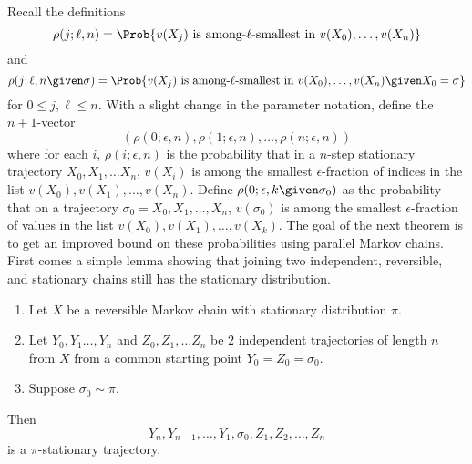 \documentclass[12pt]{article}
\begin{document}
Recall
the definitions
\[
    \rho(j; \ell, n) = \Prob{v(X_j) \text{ is among-\( \ell \)-smallest
    in } v(X_0), \dots, v(X_n) }
\] and
\[
    \rho(j; \ell, n \given \sigma) = \Prob{v(X_j) \text{ is among-\(
    \ell \)-smallest in } v(X_0), \dots, v(X_n)%
    \given X_0 = \sigma}
\] for \( 0 \le j, \ell \le n \).  With a slight change in the parameter
notation, define the \( n+1 \)-vector
\[
    (\rho(0; \epsilon, n), \rho(1; \epsilon, n), \dots, \rho(n; \epsilon,
    n))
\] where for each \( i \), \( \rho(i; \epsilon, n) \) is the probability
that in a \( n \)-step stationary trajectory \( X_0, X_1, \dots X_n \), \(
v(X_i) \) is among the smallest \( \epsilon \)-fraction of indices in
the list \( v(X_0), v(X_1), \dots, v(X_n) \).  Define \( \rho(0;
\epsilon, k \given \sigma_0) \) as the probability that on a trajectory \(
\sigma_0 = X_0, X_1, \dots, X_n \), \( v(\sigma_0) \) is among the
smallest \( \epsilon \)-fraction of values in the list \( v(X_0), v(X_1),
\dots, v(X_k) \).  The goal of the next theorem is to get an improved
bound on these probabilities using parallel Markov chains.  First comes
a simple lemma showing that joining two independent, reversible, and
stationary chains still has the stationary distribution.

\begin{lemma}
    \label{lem:parallelsignificance:stationary}
    \begin{enumerate}
        \item
            Let \( X \) be a reversible Markov chain with stationary
            distribution \( \pi \).
        \item
            Let \( Y_0, Y_1 \dots, Y_n \) and \( Z_0, Z_1, \dots Z_n \)
            be \( 2 \) independent trajectories of length \( n \) from \(
            X \) from a common starting point \( Y_0 = Z_0 = \sigma_0 \).
        \item
            Suppose \( \sigma_0 \sim \pi \).
    \end{enumerate}
    Then
    \[
        Y_n, Y_{n-1}, \dots, Y_1, \sigma_0, Z_1, Z_2, \dots, Z_n
    \] is a \( \pi \)-stationary trajectory.
\end{lemma}
\end{document}
